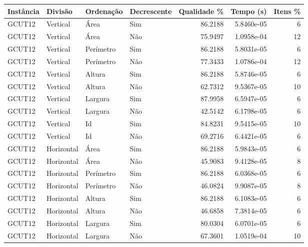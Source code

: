 \begin{tabular}{llllrrr}
    \hline
    Instância & Divisão     & Ordenação & Decrescente & Qualidade \% & Tempo (s)  & Itens \% \\
    \hline
    GCUT12    & Vertical    & Área      & Sim         & 86.2188      & 5.8460e-05 & 6        \\
    GCUT12    & Vertical    & Área      & Não         & 75.9497      & 1.0958e-04 & 12       \\
    GCUT12    & Vertical    & Perímetro & Sim         & 86.2188      & 5.8031e-05 & 6        \\
    GCUT12    & Vertical    & Perímetro & Não         & 77.3433      & 1.0786e-04 & 12       \\
    GCUT12    & Vertical    & Altura    & Sim         & 86.2188      & 5.8746e-05 & 6        \\
    GCUT12    & Vertical    & Altura    & Não         & 62.7312      & 9.5367e-05 & 10       \\
    GCUT12    & Vertical    & Largura   & Sim         & 87.9958      & 6.5947e-05 & 6        \\
    GCUT12    & Vertical    & Largura   & Não         & 42.5142      & 6.1798e-05 & 6        \\
    GCUT12    & Vertical    & Id        & Sim         & 84.8231      & 9.5415e-05 & 10       \\
    GCUT12    & Vertical    & Id        & Não         & 69.2716      & 6.4421e-05 & 6        \\
    GCUT12    & Horizontal  & Área      & Sim         & 86.2188      & 5.9843e-05 & 6        \\
    GCUT12    & Horizontal  & Área      & Não         & 45.9083      & 9.4128e-05 & 8        \\
    GCUT12    & Horizontal  & Perímetro & Sim         & 86.2188      & 6.0368e-05 & 6        \\
    GCUT12    & Horizontal  & Perímetro & Não         & 46.0824      & 9.9087e-05 & 8        \\
    GCUT12    & Horizontal  & Altura    & Sim         & 86.2188      & 6.1083e-05 & 6        \\
    GCUT12    & Horizontal  & Altura    & Não         & 46.6858      & 7.3814e-05 & 6        \\
    GCUT12    & Horizontal  & Largura   & Sim         & 80.0304      & 6.0701e-05 & 6        \\
    GCUT12    & Horizontal  & Largura   & Não         & 67.3601      & 1.0519e-04 & 10       \\

\end{tabular}
